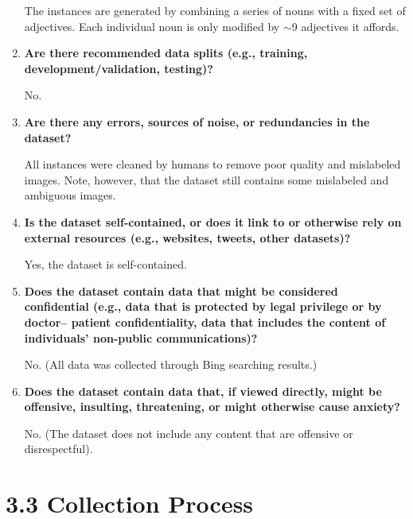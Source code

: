 \documentclass[a4paper,12pt]{article}
\begin{document}
\begin{enumerate}
   
    The instances are generated by combining a series of nouns with a fixed set of adjectives. Each individual noun is only modified by $\sim$9 adjectives it affords.

    \item \textbf{Are there recommended data splits (e.g., training, development/validation,
    testing)?}

    No.

    \item \textbf{Are there any errors, sources of noise, or redundancies in the
    dataset?}

    All instances were cleaned by humans to remove poor quality and mislabeled images. Note, however, that the dataset still contains some mislabeled and ambiguous images.    

    \item \textbf{Is the dataset self-contained, or does it link to or otherwise rely on
    external resources (e.g., websites, tweets, other datasets)?}

    Yes, the dataset is self-contained.

    \item \textbf{Does the dataset contain data that might be considered confidential (e.g., data that is protected by legal privilege or by doctor–
    patient confidentiality, data that includes the content of individuals’ non-public communications)? }

    No. (All data was collected through Bing searching results.)

    \item \textbf{Does the dataset contain data that, if viewed directly, might be offensive, insulting, threatening, or might otherwise cause anxiety?}
    
    No. (The dataset does not include any content that are offensive or disrespectful).

\end{enumerate}

\section*{3.3 Collection Process}
\end{document}
